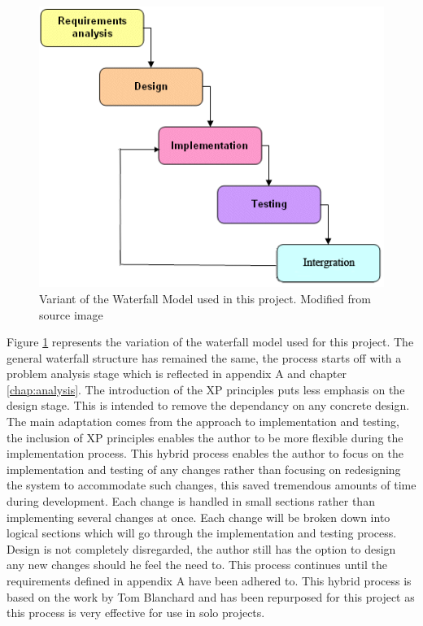 \begin{figure}[H]
\centering
\includegraphics[scale=0.7]{Images/chapter3/waterfallmodel}
\caption[Waterfall Model Variant]{Variant of the Waterfall Model used in this project. Modified from source image \cite{waterfall:image}}
\label{fig:waterfall}
\end{figure}

Figure \ref{fig:waterfall} represents the variation of the waterfall model used for this project. The general waterfall structure has remained the same, the process starts off with a problem analysis stage which is reflected in appendix A and chapter \ref{chap:analysis}. The introduction of the XP principles puts less emphasis on the design stage. This is intended to remove the dependancy on any concrete design. The main adaptation comes from the approach to implementation and testing, the inclusion of XP principles enables the author to be more flexible during the implementation process. This hybrid process enables the author to focus on the implementation and testing of any changes rather than focusing on redesigning the system to accommodate such changes, this saved tremendous amounts of time during development. Each change is handled in small sections rather than implementing several changes at once. Each change will be broken down into logical sections which will go through the implementation and testing process. Design is not completely disregarded, the author still has the option to design any new changes should he feel the need to. This process continues until the requirements defined in appendix A have been adhered to. This hybrid process is based on the work by Tom Blanchard \cite{tblanch:diss} and has been repurposed for this project as this process is very effective for use in solo projects.
